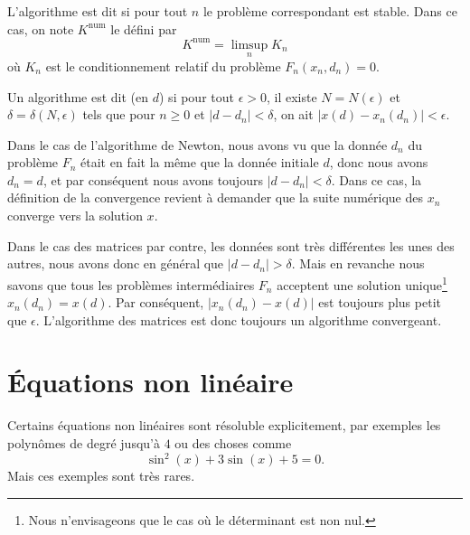 L'algorithme est dit  si pour tout $n$ le problème correspondant est stable.  Dans ce cas, on note $K^{\mbox{num}}$ le   défini par
\begin{equation}
	K^{\mbox{num}}=\limsup_nK_n
\end{equation}
où $K_n$ est le conditionnement relatif du problème $F_n(x_n,d_n)=0$.

\begin{definition}      \label{DefAlgoConverge}
	Un algorithme est dit  (en $d$) si pour tout $\epsilon>0$, il existe $N=N(\epsilon)$ et $\delta=\delta(N,\epsilon)$ tels que pour $n\geq0$ et $|d-d_n|<\delta$, on ait $|x(d)-x_n(d_n)|<\epsilon$.
\end{definition}

\begin{remark}      \label{RemConvAlgoNewton}
Dans le cas de l'algorithme de Newton, nous avons vu que la donnée $d_n$ du problème $F_n$ était en fait la même que la donnée initiale $d$, donc nous avons $d_n=d$, et par conséquent nous avons toujours $| d-d_n |<\delta$. Dans ce cas, la définition de la convergence revient à demander que la suite numérique des $x_n$ converge vers la solution $x$.
\end{remark}

\begin{remark}
Dans le cas des matrices par contre, les données sont très différentes les unes des autres, nous avons donc en général que $| d-d_n |>\delta$. Mais en revanche nous savons que tous les problèmes intermédiaires $F_n$ acceptent une solution unique\footnote{Nous n'envisageons que le cas où le déterminant est non nul.} $x_n(d_n)=x(d)$. Par conséquent, $| x_n(d_n)-x(d) |$ est toujours plus petit que $\epsilon$. L'algorithme des matrices est donc toujours un algorithme convergeant.
\end{remark}

\section{Équations non linéaire}

Certains équations non linéaires sont résoluble explicitement, par exemples les polynômes de degré jusqu'à \( 4\) ou des choses comme
\begin{equation}
	\sin^2(x)+3\sin(x)+5=0.
\end{equation}
Mais ces exemples sont très rares.

